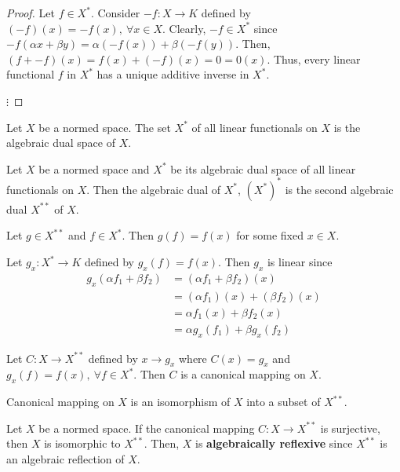 \begin{commentary}
\begin{proof}
	Let $f \in X^\ast$.
	Consider $-f : X \to K$ defined by $(-f)(x) = -f(x),\ \forall x \in X$.
	Clearly, $-f \in X^\ast$ since $-f(\alpha x + \beta y) = \alpha (-f(x)) + \beta (-f(y))$.
	Then, $(f + -f)(x) = f(x) + (-f)(x) = 0 = 0(x)$.
	Thus, every linear functional $f$ in $X^\ast$ has a unique additive inverse in $X^\ast$.

	$\vdots$
\end{proof}
\end{commentary}

\begin{definition}
	Let $X$ be a normed space.
	The set $X^\ast$ of all linear functionals on $X$ is the algebraic dual space of $X$.
\end{definition}

\begin{definition}
	Let $X$ be a normed space and $X^\ast$ be its algebraic dual space of all linear functionals on $X$.
	Then the algebraic dual of $X^\ast$, $(X^\ast)^\ast$ is the second algebraic dual $X^{\ast\ast}$ of $X$.
\end{definition}

\begin{important}
\begin{remark}
	Let $g \in X^{\ast\ast}$ and $f \in X^\ast$.
	Then $g(f) = f(x)$ for some fixed $x \in X$.
\end{remark}
\end{important}

\begin{remark}
	Let $g_x : X^\ast \to K$ defined by $g_x(f) = f(x)$.
	Then $g_x$ is linear since
	\begin{align*}
		g_x(\alpha f_1 + \beta f_2) 
		& = (\alpha f_1 + \beta f_2)(x) \\
		& = (\alpha f_1)(x) + (\beta f_2)(x) \\
		& = \alpha f_1(x) + \beta f_2(x) \\
		& = \alpha g_x(f_1) + \beta g_x(f_2)
	\end{align*}
\end{remark}
\begin{definition}
	Let $C : X \to X^{\ast\ast}$ defined by $x \to g_x$ where $C(x) = g_x$ and $g_x(f) = f(x),\ \forall f \in X^\ast$.
	Then $C$ is a canonical mapping on $X$.
\end{definition}
\begin{remark}
	Canonical mapping on $X$ is an isomorphism of $X$ into a subset of $X^{\ast\ast}$.
\end{remark}
\begin{definition}
	Let $X$ be a normed space.
	If the canonical mapping $C : X \to X^{\ast\ast}$ is surjective, then $X$ is isomorphic to $X^{\ast\ast}$.
	Then, $X$ is \textbf{algebraically reflexive} since $X^{\ast\ast}$ is an algebraic reflection of $X$.
\end{definition}

